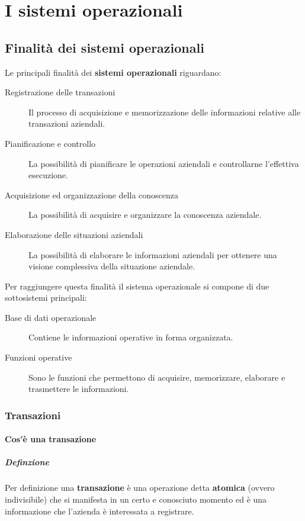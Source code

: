 \chapter{I sistemi operazionali}
\thispagestyle{chapterInit}
\label{ch:operazionali}

\section{Finalità dei sistemi operazionali}
    Le principali finalità dei \textbf{sistemi operazionali} riguardano:
    \begin{description}
        \item[Registrazione delle transazioni] Il processo di acquisizione e memorizzazione delle informazioni relative alle transazioni aziendali.
        \item[Pianificazione e controllo] La possibilità di pianificare le operazioni aziendali e controllarne l'effettiva esecuzione.
        \item[Acquisizione ed organizzazione della conoscenza] La possibilità di acquisire e organizzare la conoscenza aziendale.
        \item[Elaborazione delle situazioni aziendali] La possibilità di elaborare le informazioni aziendali per ottenere una visione complessiva della situazione aziendale.
    \end{description}
    Per raggiungere questa finalità il sistema operazionale si compone di due sottosistemi principali:
    \begin{description}
        \item[Base di dati operazionale] Contiene le informazioni operative in forma organizzata.
        \item[Funzioni operative] Sono le funzioni che permettono di acquisire, memorizzare, elaborare e trasmettere le informazioni.
    \end{description}
    \subsection{Transazioni}
        \subsubsection{Cos'è una transazione}
            \paragraph{Definzione} Per definizione una \textbf{transazione} è una operazione detta \textbf{atomica} (ovvero indivisibile) che si manifesta in un certo e conosciuto momento ed è una informazione che l'azienda è interessata a registrare.
